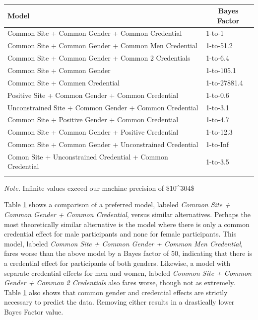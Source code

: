 \documentclass[english,man]{apa6}
\theoremstyle{definition}
\theoremstyle{definition}
\theoremstyle{definition}
\theoremstyle{remark}
\begin{document}
\begin{table}[tbp]
\begin{center}
\begin{threeparttable}
\caption{\label{tab:ml3BF}}
\begin{tabular}{ll}
\toprule
Model & \multicolumn{1}{c}{Bayes Factor}\\
\midrule
Common Site + Common Gender + Common Credential & 1-to-1\\
Common Site + Common Gender + Common Men Credential & 1-to-51.2\\
Common Site + Common Gender + Common 2 Credentials & 1-to-6.4\\
Common Site + Common Gender & 1-to-105.1\\
Common Site + Commen Credential & 1-to-27881.4\\
Positive Site + Common Gender + Common Credential & 1-to-0.6\\
Unconstrained Site + Common Gender + Common Credential & 1-to-3.1\\
Common Site + Positive Gender + Common Credential & 1-to-4.7\\
Common Site + Common Gender + Positive Credential & 1-to-12.3\\
Common Site + Common Gender + Unconstrained Credential & 1-to-Inf\\
Comon Site + Unconstrained Credential + Common Credential & 1-to-3.5\\
\bottomrule
\addlinespace
\end{tabular}
\begin{tablenotes}[para]
\textit{Note.} Infinite values exceed our machine precision of \$10\textasciicircum{}304\$
\end{tablenotes}
\end{threeparttable}
\end{center}
\end{table}

Table \ref{tab:ml3BF} shows a comparison of a preferred model, labeled
\emph{Common Site + Common Gender + Common Credential}, versus similar
alternatives. Perhaps the most theoretically similar alternative is the
model where there is only a common credential effect for male
participants and none for female participants. This model, labeled
\emph{Common Site + Common Gender + Common Men Credential}, fares worse
than the above model by a Bayes factor of 50, indicating that there is a
credential effect for participants of both genders. Likewise, a model
with separate credential effects for men and women, labeled \emph{Common
Site + Common Gender + Common 2 Credentials} also fares worse, though
not as extremely. Table \ref{tab:ml3BF} also shows that common gender
and credential effects are strictly necessary to predict the data.
Removing either results in a drastically lower Bayes Factor value.
\end{document}
